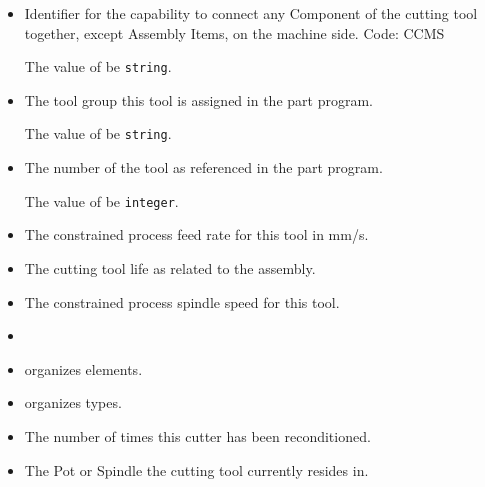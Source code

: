 \begin{itemize}

\item {} \newline Identifier for the capability to connect any Component of the cutting tool together, except Assembly Items, on the machine side. Code: CCMS

The value of  \MUST be \texttt{string}.

\item {} \newline The tool group this tool is assigned in the part program.

The value of  \MUST be \texttt{string}.

\item {} \newline The number of the tool as referenced in the part program.

The value of  \MUST be \texttt{integer}.

\item {} \newline The constrained process feed rate for this tool in mm/s.

\item {} \newline The cutting tool life as related to the assembly.

\item {} \newline The constrained process spindle speed for this tool.


\item {} \newline 

\item {} \newline {} \glspl{organize}  elements.

\item {} \newline {} \glspl{organize}  types.

\item {} \newline The number of times this cutter has been reconditioned.


\item {} \newline The Pot or Spindle the cutting tool currently resides in.
\end{itemize}



